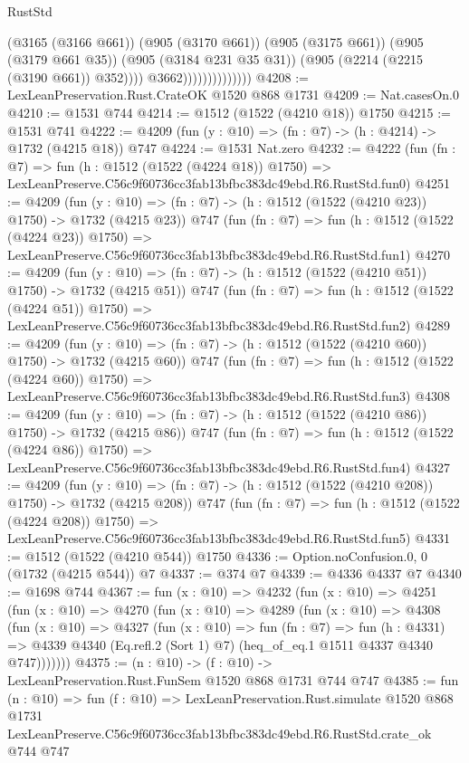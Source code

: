 \begin{lexlean}{RustStd}
\begin{coremodule}
                                    (@3165 (@3166 @661))
                                    (@905 (@3170 @661))
                                    (@905 (@3175 @661))
                                    (@905 (@3179 @661 @35))
                                    (@905 (@3184 @231 @35 @31))
                                    (@905 (@2214 (@2215 (@3190 @661)) @352))))
                                @3662))))))))))))))
@4208 := LexLeanPreservation.Rust.CrateOK @1520 @868 @1731
@4209 := Nat.casesOn.{0}
@4210 := @1531 @744
@4214 := @1512 (@1522 (@4210 @18)) @1750
@4215 := @1531 @741
@4222 := @4209 (fun (y : @10) => (fn : @7) -> (h : @4214) -> @1732 (@4215 @18)) @747
@4224 := @1531 Nat.zero
@4232 := @4222
    (fun (fn : @7) =>
    fun (h : @1512 (@1522 (@4224 @18)) @1750) =>
    LexLeanPreserve.C56c9f60736cc3fab13bfbc383dc49ebd.R6.RustStd.fun0)
@4251 := @4209
    (fun (y : @10) => (fn : @7) -> (h : @1512 (@1522 (@4210 @23)) @1750) -> @1732 (@4215 @23))
    @747
    (fun (fn : @7) =>
    fun (h : @1512 (@1522 (@4224 @23)) @1750) =>
    LexLeanPreserve.C56c9f60736cc3fab13bfbc383dc49ebd.R6.RustStd.fun1)
@4270 := @4209
    (fun (y : @10) => (fn : @7) -> (h : @1512 (@1522 (@4210 @51)) @1750) -> @1732 (@4215 @51))
    @747
    (fun (fn : @7) =>
    fun (h : @1512 (@1522 (@4224 @51)) @1750) =>
    LexLeanPreserve.C56c9f60736cc3fab13bfbc383dc49ebd.R6.RustStd.fun2)
@4289 := @4209
    (fun (y : @10) => (fn : @7) -> (h : @1512 (@1522 (@4210 @60)) @1750) -> @1732 (@4215 @60))
    @747
    (fun (fn : @7) =>
    fun (h : @1512 (@1522 (@4224 @60)) @1750) =>
    LexLeanPreserve.C56c9f60736cc3fab13bfbc383dc49ebd.R6.RustStd.fun3)
@4308 := @4209
    (fun (y : @10) => (fn : @7) -> (h : @1512 (@1522 (@4210 @86)) @1750) -> @1732 (@4215 @86))
    @747
    (fun (fn : @7) =>
    fun (h : @1512 (@1522 (@4224 @86)) @1750) =>
    LexLeanPreserve.C56c9f60736cc3fab13bfbc383dc49ebd.R6.RustStd.fun4)
@4327 := @4209
    (fun (y : @10) => (fn : @7) -> (h : @1512 (@1522 (@4210 @208)) @1750) -> @1732 (@4215 @208))
    @747
    (fun (fn : @7) =>
    fun (h : @1512 (@1522 (@4224 @208)) @1750) =>
    LexLeanPreserve.C56c9f60736cc3fab13bfbc383dc49ebd.R6.RustStd.fun5)
@4331 := @1512 (@1522 (@4210 @544)) @1750
@4336 := Option.noConfusion.{0, 0} (@1732 (@4215 @544)) @7
@4337 := @374 @7
@4339 := @4336 @4337 @7
@4340 := @1698 @744
@4367 := fun (x : @10) =>
  @4232
    (fun (x : @10) =>
    @4251
      (fun (x : @10) =>
      @4270
        (fun (x : @10) =>
        @4289
          (fun (x : @10) =>
          @4308
            (fun (x : @10) =>
            @4327
              (fun (x : @10) =>
              fun (fn : @7) =>
              fun (h : @4331) =>
              @4339 @4340 (Eq.refl.{2} (Sort 1) @7) (heq_of_eq.{1} @1511 @4337 @4340 @747)))))))
@4375 := (n : @10) -> (f : @10) -> LexLeanPreservation.Rust.FunSem @1520 @868 @1731 @744 @747
@4385 := fun (n : @10) =>
  fun (f : @10) =>
  LexLeanPreservation.Rust.simulate
    @1520
    @868
    @1731
    LexLeanPreserve.C56c9f60736cc3fab13bfbc383dc49ebd.R6.RustStd.crate_ok
    @744
    @747
\end{coremodule}
\end{lexlean}

